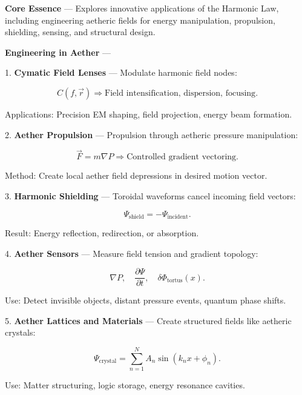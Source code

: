
\textbf{Core Essence} --- Explores innovative applications of the Harmonic Law, including engineering aetheric fields for energy manipulation, propulsion, shielding, sensing, and structural design.

\textbf{Engineering in Aether} ---

1. \textbf{Cymatic Field Lenses} --- Modulate harmonic field nodes:

$$
C(f, \vec{r}) \Rightarrow \text{Field intensification, dispersion, focusing}.
$$

Applications: Precision EM shaping, field projection, energy beam formation.

2. \textbf{Aether Propulsion} --- Propulsion through aetheric pressure manipulation:

$$
\vec{F} = m \nabla P \Rightarrow \text{Controlled gradient vectoring}.
$$

Method: Create local aether field depressions in desired motion vector.

3. \textbf{Harmonic Shielding} --- Toroidal waveforms cancel incoming field vectors:

$$
\Psi_{\text{shield}} = -\Psi_{\text{incident}}.
$$

Result: Energy reflection, redirection, or absorption.

4. \textbf{Aether Sensors} --- Measure field tension and gradient topology:

$$
\nabla P, \quad \frac{\partial \Psi}{\partial t}, \quad \delta \Phi_{\text{tortus}}(x).
$$

Use: Detect invisible objects, distant pressure events, quantum phase shifts.

5. \textbf{Aether Lattices and Materials} --- Create structured fields like aetheric crystals:

$$
\Psi_{\text{crystal}} = \sum_{n=1}^N A_n \sin \left( k_n x + \phi_n \right).
$$

Use: Matter structuring, logic storage, energy resonance cavities.


